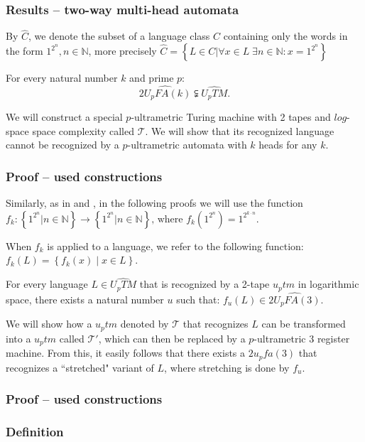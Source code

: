 \documentclass{beamer}
\begin{document}
\begin{frame}
\frametitle{Results -- two-way multi-head automata}
By $\widehat{C}$, we denote the subset of a language class $C$ containing only the words in the form $1^{2^n}, n \in \mathbb{N}$, more precisely  
$\widehat{C} = \left\{ L \in C | \forall x \in L \; \exists n \in \mathbb{N} : x = 1^{2^n} \right\}$

\begin{theorem} \label{atdalisana}
For every natural number $k$ and prime $p$:
\[
	\widehat{2\mathit{U_pFA}(k)} \subsetneqq \widehat{U_pTM}.
\]
\end{theorem}
We will construct a special $p$-ultrametric Turing machine with 2 tapes and $log$-space space complexity called $\mathcal{T}$. We will show that its recognized language cannot be recognized by a $p$-ultrametric automata with $k$ heads for any $k$.

\end{frame}

\begin{frame}
\frametitle{Proof -- used constructions}
Similarly, as in \citep{Macarie1995} and \citep{Monien1980}, in the following proofs we will use the function
$
	f_k : \left\{ 1^{2^n} | n \in \mathbb{N} \right\} \rightarrow \left\{ 1^{2^n} | n \in \mathbb{N} \right\} \textrm{, where } f_k( 1^{2^n}) = 1^{2^{k \cdot n}}
$.

When $f_k$ is applied to a language, we refer to the following function: $f_k(L) = \left\{ f_k(x) \middle| x\in L \right\}$.

\begin{lemma} \label{skaititaji}
For every language $L \in \widehat{U_pTM}$ that is recognized by a 2-tape $u_ptm$ in logarithmic space, there exists a natural number $u$ such that:
$
	f_u(L) \in \widehat{2\mathit{U_pFA}(3)}.
$
\end{lemma}
We will show how a $u_ptm$ denoted by $\mathcal{T}$ that recognizes $L$ can be transformed into a $u_ptm$ called $\mathcal{T'}$, which can then be replaced by a $p$-ultrametric $3$ register machine. From this, it easily follows that there exists a $2\mathit{u_pfa}(3)$ that recognizes a ``stretched"  variant of $L$, where stretching is done by $f_u$.

\end{frame}
\begin{frame}
\frametitle{Proof -- used constructions}

\end{frame}
\begin{frame}
\frametitle{Definition}

\end{frame}
\end{document}
